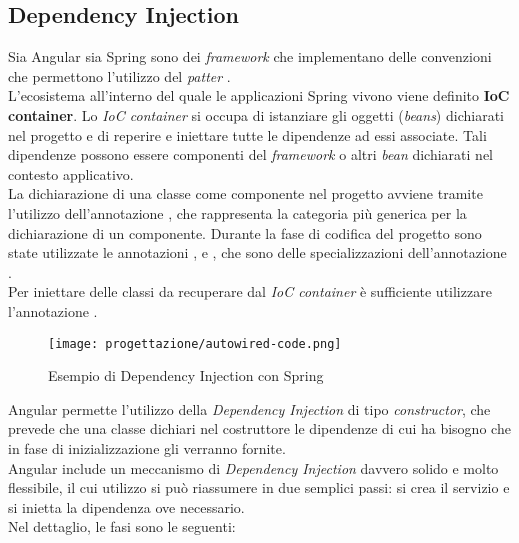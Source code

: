 \subsection{Dependency Injection}
\label{sub:Dependency-Injection}
Sia Angular sia Spring sono dei \textit{framework} che implementano delle convenzioni che permettono l'utilizzo del \textit{patter} .\\
L'ecosistema all'interno del quale le applicazioni Spring vivono viene definito \textbf{IoC container}. Lo \textit{IoC container} si occupa di istanziare gli oggetti (\textit{beans}) dichiarati nel progetto e di reperire e iniettare tutte le dipendenze ad essi associate. Tali dipendenze possono essere componenti del \textit{framework} o altri \textit{bean} dichiarati nel contesto applicativo.\\
La dichiarazione di una classe come componente nel progetto avviene tramite l'utilizzo dell'annotazione , che rappresenta la categoria più generica per la dichiarazione di un componente.
Durante la fase di codifica del progetto sono state utilizzate le annotazioni ,  e , che sono delle specializzazioni dell'annotazione .\\
Per iniettare delle classi da recuperare dal \textit{IoC container} è sufficiente utilizzare l'annotazione .
\begin{figure}[H] 
    \centering 
    \texttt{[image: progettazione/autowired-code.png]}
    \caption{Esempio di Dependency Injection con Spring}
\end{figure}
\noindent Angular permette l'utilizzo della \textit{Dependency Injection} di tipo \textit{constructor}, che prevede che una classe dichiari nel costruttore le dipendenze di cui ha bisogno che in fase di inizializzazione gli verranno fornite.\\
Angular include un meccanismo di \textit{Dependency Injection} davvero solido e molto flessibile, il cui utilizzo si può riassumere in due semplici passi: si crea il servizio e si inietta la dipendenza ove necessario.\\
Nel dettaglio, le fasi sono le seguenti: 
